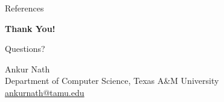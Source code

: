 \documentclass[aspectratio=169,xcolor=dvipsnames,8pt]{beamer}
\begin{document}

\begin{frame}{References}
  
  
\end{frame}

\begin{frame}[plain]
  \centering
  \vspace{1cm}
  \Huge \textbf{Thank You!}

  \vspace{0.8cm}
  \Large Questions?

  \vspace{1cm}
  \normalsize
  Ankur Nath\\
  \vspace{0.2cm}
  Department of Computer Science, Texas A\&M University\\
  \vspace{0.3cm}
  \small
  \href{mailto:ankurnath@tamu.edu}{ankurnath@tamu.edu}
\end{frame}

\end{document}
